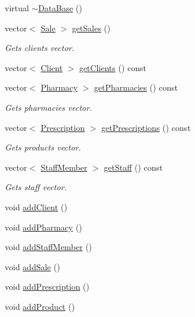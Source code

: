 \begin{DoxyCompactItemize}
virtual \hyperlink{classDataBase_a9d4629e705ccaa4897e9650222a2a648}{$\sim$\+Data\+Base} ()
\item 
vector$<$ \hyperlink{classSale}{Sale} $>$ \hyperlink{classDataBase_a0c0c3efb8ee0d6e1a4b2d97b8d35feeb}{get\+Sales} ()
\begin{DoxyCompactList}\small\item\em Gets clients vector. \end{DoxyCompactList}\item 
vector$<$ \hyperlink{classClient}{Client} $>$ \hyperlink{classDataBase_a9ad743bfac0c4b7b4a6f2eaa1d4e8160}{get\+Clients} () const
\item 
vector$<$ \hyperlink{classPharmacy}{Pharmacy} $>$ \hyperlink{classDataBase_a5c7fcbdcc70d9ac4e27188d39b8c9e1a}{get\+Pharmacies} () const
\begin{DoxyCompactList}\small\item\em Gets pharmacies vector. \end{DoxyCompactList}\item 
vector$<$ \hyperlink{classPrescription}{Prescription} $>$ \hyperlink{classDataBase_a2c08363a2f1360996983fdd89760af37}{get\+Prescriptions} () const
\begin{DoxyCompactList}\small\item\em Gets products vector. \end{DoxyCompactList}\item 
vector$<$ \hyperlink{classStaffMember}{Staff\+Member} $>$ \hyperlink{classDataBase_ad44eb614d0001979c6036e57af6b9e06}{get\+Staff} () const
\begin{DoxyCompactList}\small\item\em Gets staff vector. \end{DoxyCompactList}\item 
void \hyperlink{classDataBase_a1eebe53a8f3c83af5d75d3a83590ca01}{add\+Client} ()
\item 
void \hyperlink{classDataBase_a4a6fca7606a5734e623a3d8ea7c00fa4}{add\+Pharmacy} ()
\item 
void \hyperlink{classDataBase_aed28994adfb33442ffd3469496150da8}{add\+Staff\+Member} ()
\item 
void \hyperlink{classDataBase_a0fb00cab402248ffba3903cc1f19f6c2}{add\+Sale} ()
\item 
void \hyperlink{classDataBase_a82e38546b8cb54beffd3185a13a838aa}{add\+Prescription} ()
\item 
void \hyperlink{classDataBase_a654216132c946bdb05ec4ae866302259}{add\+Product} ()
\item 

\end{DoxyCompactItemize}
